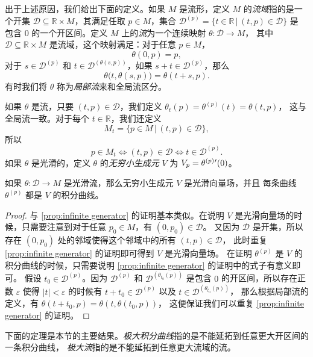 出于上述原因，我们给出下面的定义。如果 $M$ 是流形，定义 $M$ 的\emph{流域}指的是一个开集
$\mathcal{D}\subseteq \mathbb{R}\times M$，其满足任取 $p\in M$，集合
$\mathcal{D}^{(p)}=\{t\in \mathbb{R}\,|\, (t,p)\in \mathcal{D}\}$ 是
包含 $0$ 的一个开区间。定义 $M$ 上的\emph{流}为一个连续映射 $\theta:\mathcal{D}\to M$，
其中 $\mathcal{D}\subseteq \mathbb{R}\times M$ 是流域，这个映射满足：对于任意 $p\in M$，
\[
  \theta(0,p)=p,
\]
对于 $s\in \mathcal{D}^{(p)}$ 和 $t\in \mathcal{D}^{(\theta(s,p))}$，如果
$s+t\in \mathcal{D}^{(p)}$，那么
\[
  \theta\bigl(t,\theta(s,p)\bigr)=\theta(t+s,p).
\]
有时我们将 $\theta$ 称为\emph{局部流}来和全局流区分。

如果 $\theta$ 是流，只要 $(t,p)\in \mathcal{D}$，我们定义 $\theta_t(p)=\theta^{(p)}(t)=\theta(t,p)$，
这与全局流一致。对于每个 $t\in \mathbb{R}$，我们还定义
\[
  M_t=\{p\in M\,|\, (t,p)\in \mathcal{D}\},
\]
所以
\[
  p\in M_t\Leftrightarrow (t,p)\in \mathcal{D}\Leftrightarrow t\in \mathcal{D}^{(p)}.
\]
如果 $\theta$ 是光滑的，定义 $\theta$ 的\emph{无穷小生成元} $V$ 为 $V_p=\smash{\theta^{(p)}}'(0)$。

\begin{proposition}
  如果 $\theta:\mathcal{D}\to M$ 是光滑流，那么无穷小生成元 $V$ 是光滑向量场，并且
  每条曲线 $\theta^{(p)}$ 都是 $V$ 的积分曲线。
\end{proposition}
\begin{proof}
  与 \autoref{prop:infinite generator} 的证明基本类似。在说明 $V$
  是光滑向量场的时候，只需要注意到对于任意 $p_0\in M$，有 $(0,p_0)\in \mathcal{D}$。
  又因为 $\mathcal{D}$ 是开集，所以存在 $(0,p_0)$ 处的邻域使得这个邻域中的所有 $(t,p)\in \mathcal{D}$，
  此时重复 \autoref{prop:infinite generator} 的证明即可得到 $V$ 是光滑向量场。
  在证明 $\theta^{(p)}$ 是 $V$ 的积分曲线的时候，只需要说明
  \autoref{prop:infinite generator} 的证明中的式子有意义即可。
  假设 $t_0\in \mathcal{D}^{(p)}$。因为 $\mathcal{D}^{(p)}$ 和 $\mathcal{D}^{(\theta_{t_0}(p))}$
  是包含 $0$ 的开区间，所以存在正数 $\varepsilon$ 使得 $|t|<\varepsilon$
  的时候有 $t+t_0\in \mathcal{D}^{(p)}$ 以及 $t\in \mathcal{D}^{(\theta_{t_0}(p))}$，
  那么根据局部流的定义，有 $\theta(t+t_0,p)=\theta(t,\theta(t_0,p))$，
  这便保证我们可以重复 \autoref{prop:infinite generator} 的证明。
\end{proof}

下面的定理是本节的主要结果。\emph{极大积分曲线}指的是不能延拓到任意更大开区间的一条积分曲线，
\emph{极大流}指的是不能延拓到任意更大流域的流。

